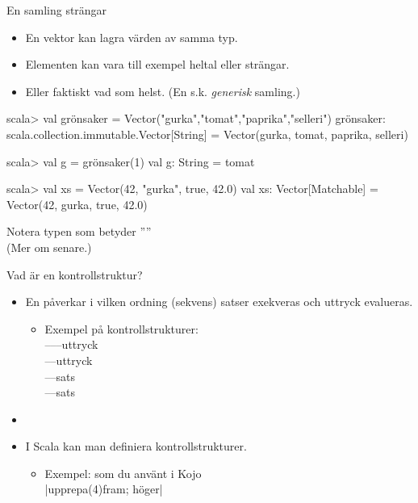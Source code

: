 \begin{Slide}{En samling strängar}

\begin{itemize}
\item En vektor kan lagra  värden av samma typ.
\item Elementen kan vara till exempel heltal eller strängar.
\item Eller faktiskt vad som helst. (En s.k. \emph{generisk} samling.)
\end{itemize}

\begin{REPL}
scala> val grönsaker = Vector("gurka","tomat","paprika","selleri")
grönsaker: scala.collection.immutable.Vector[String] =
  Vector(gurka, tomat, paprika, selleri)

scala> val g = grönsaker(1)
val g: String = tomat

scala> val xs = Vector(42, "gurka", true, 42.0)
val xs: Vector[Matchable] = Vector(42, gurka, true, 42.0)
\end{REPL}
\SlideFontSmall Notera typen  som betyder ''''\\
(Mer om  senare.)
\end{Slide}





\begin{Slide}{Vad är en kontrollstruktur?}
\begin{itemize}
\item En  påverkar i vilken ordning (sekvens) satser exekveras och uttryck evalueras.
\begin{itemize}
\item[] Exempel på  kontrollstrukturer:
\\\vspace{0.5em}------uttryck
\\----uttryck
\\----sats 
\\----sats 
\end{itemize}

\item[]

\item I Scala kan man definiera  kontrollstrukturer.
\begin{itemize}
\item[] Exempel:  som du använt i Kojo
\\\vspace{0.5em}\code|upprepa(4){fram; höger}|
\end{itemize}
\end{itemize}
\end{Slide}

